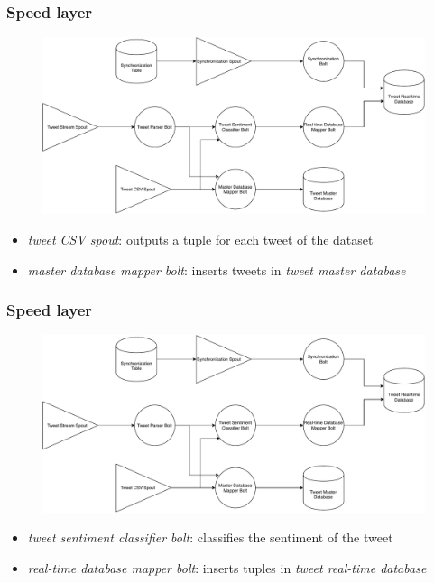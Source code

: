 \documentclass[xcolor=table, unknownkeysallowed]{beamer}
\begin{document}
\begin{frame}
\frametitle{Speed layer}
\vspace{-0.5cm}
\begin{figure}
\includegraphics[width=0.95\linewidth]{img/storm_topology_diagram}
\label{fig:storm_topology_diagram}
\end{figure}
\begin{itemize}
\item \emph{tweet CSV spout}: outputs a tuple for each tweet of the dataset
\vspace{0.15cm} 
\item \emph{master database mapper bolt}: inserts tweets in \emph{tweet master database}
\end{itemize}
\end{frame}


\begin{frame}
\frametitle{Speed layer}
\vspace{-0.275cm}
\begin{figure}
\includegraphics[width=0.95\linewidth]{img/storm_topology_diagram}
\label{fig:storm_topology_diagram}
\end{figure}
\begin{itemize}
\item \emph{tweet sentiment classifier bolt}: classifies the sentiment of the tweet
\vspace{0.15cm}
\item \emph{real-time database mapper bolt}: inserts tuples in \emph{tweet real-time database}
\end{itemize}
\end{frame}
\end{document}
